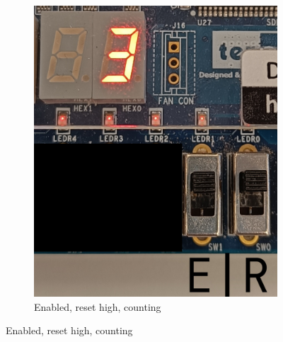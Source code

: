 \documentclass{article}
\begin{document}
\begin{figure}[h]
\begin{subfigure}[t]{0.45\textwidth}
        \includegraphics[width=1\textwidth]{Figures/Part3_2.jpg}
        \caption{Enabled, reset high, counting}
        \label{fig:p3_2}
    \end{subfigure}
    

\end{figure}
\end{document}
